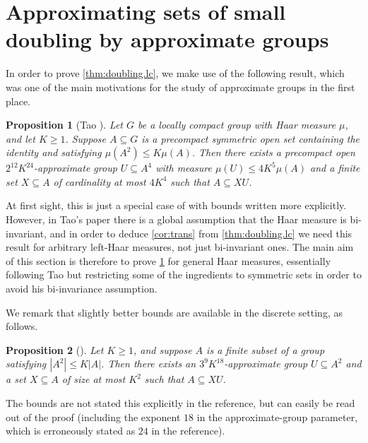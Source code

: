 \documentclass[10pt]{article}
\newtheorem{prop}{Proposition}[section]
\begin{document}
\section{Approximating sets of small doubling by approximate groups}
In order to prove \cref{thm:doubling.lc}, we make use of the following result, which was one of the main motivations for the study of approximate groups in the first place.
\begin{prop}[Tao \cite{tao.product.set}]\label{prop:doubling.covered.by.app.grp-lc}
Let $G$ be a locally compact group with Haar measure $\mu$, and let $K\ge1$. Suppose $A\subseteq G$ is a precompact symmetric open set containing the identity and satisfying $\mu(A^2)\le K\mu(A)$. Then there exists a precompact open $2^{12}K^{24}$-approximate group $U\subseteq A^4$ with measure $\mu(U)\le 4K^5\mu(A)$ and a finite set $X\subseteq A$ of cardinality at most $4K^4$ such that $A\subseteq XU$.
\end{prop}
At first sight, this is just a special case of \cite[Theorem 4.6]{tao.product.set} with bounds written more explicitly. However, in Tao's paper there is a global assumption that the Haar measure is bi-invariant, and in order to deduce \cref{cor:trans} from \cref{thm:doubling.lc} we need this result for arbitrary left-Haar measures, not just bi-invariant ones. The main aim of this section is therefore to prove \cref{prop:doubling.covered.by.app.grp-lc} for general Haar measures, essentially following Tao but restricting some of the ingredients to symmetric sets in order to avoid his bi-invariance assumption.

We remark that slightly better bounds are available in the discrete setting, as follows.
\begin{prop}[{\cite[Theorem 2.5.6]{book}}]\label{prop:doubling.covered.by.app.grp}
Let $K\ge1$, and suppose $A$ is a finite subset of a group satisfying $|A^2|\le K|A|$. Then there exists an $3^9K^{18}$-approximate group $U\subseteq A^2$ and a set $X\subseteq A$ of size at most $K^2$ such that $A\subseteq XU$.
\end{prop}
The bounds are not stated this explicitly in the reference, but can easily be read out of the proof (including the exponent $18$ in the approximate-group parameter, which is erroneously stated as $24$ in the reference).
\end{document}
